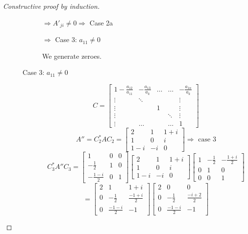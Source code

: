 \documentclass[a4paper,landscape,twocolumn]{article}
\begin{document}
\begin{proof}[Constructive proof by induction]
\begin{description}
\begin{description}
          $\Rightarrow A'_{ji} \neq 0 \Rightarrow$ Case 2a

          $\Rightarrow$ Case 3: $a_{11} \neq 0$

          We generate zeroes.

        \item[Case 3: $a_{11} \neq 0$]
          \[
            C = \begin{bmatrix}
              1 - \frac{a_{12}}{a_{11}} & -\frac{a_{13}}{a_{k}} & \ldots & \ldots & -\frac{a_{1n}}{a_{k}} \\
              \vdots & \ddots &   &        & \vdots \\
              \vdots &        & 1 &        & \vdots \\
              \vdots &        &   & \ddots & \vdots \\
              \vdots & \ldots &   & \ldots & 1
            \end{bmatrix}
          \] \[
            A'' = C_2^* A C_2 = \begin{bmatrix}
              2 & 1 & 1+i \\
              1 & 0 & i \\
              1-i & -i & 0
            \end{bmatrix}
            \Rightarrow \text{ case 3}
          \] \[
            C_3^* A'' C_3 =
            \begin{bmatrix}
              1 & 0 & 0 \\
              -\frac12 & 1 & 0 \\
              -\frac{1-i}{2} & 0 & 1
            \end{bmatrix}
            \begin{bmatrix}
              2 & 1 & 1+i \\
              1 & 0 & i \\
              1-i & -i & 0
            \end{bmatrix}
            \begin{bmatrix}
              1 & -\frac12 & -\frac{1+i}{2} \\
              0 & 1 & 0 \\
              0 & 0 & 1
            \end{bmatrix}
          \] \[
            = \begin{bmatrix}
              2 & 1 & 1+i \\
              0 & -\frac12 & \frac{-1+i}{2} \\
              0 & \frac{-1-i}{2} & -1
            \end{bmatrix} \begin{bmatrix}
              2 & 0 & 0 \\
              0 & -\frac12 & \frac{-i+2}{2} \\
              0 & \frac{-1-i}{2} & -1
            \end{bmatrix}
          \]
      \end{description}
  \end{description}
\end{proof}
\end{document}
